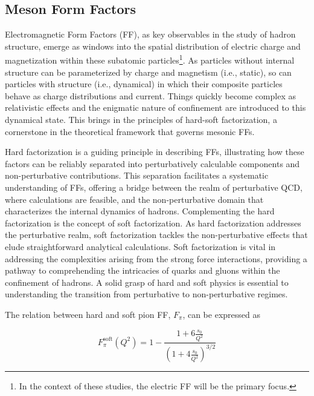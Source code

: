 \documentclass[
]{report}
\begin{document}
\label{Chapter-1-2}

\hypertarget{meson-form-factors}{%
\subsection{Meson Form Factors}\label{meson-form-factors}}

Electromagnetic Form Factors (FF), as key observables in the study of
hadron structure, emerge as windows into the spatial distribution of
electric charge and magnetization within these subatomic
particles\footnote{In the context of these studies, the electric FF will be the primary focus.}.
As particles without internal structure can be parameterized by charge
and magnetism (i.e., static), so can particles with structure (i.e.,
dynamical) in which their composite particles behave as charge
distributions and current. Things quickly become complex as relativistic
effects and the enigmatic nature of confinement are introduced to this
dynamical state. This brings in the principles of hard-soft
factorization, a cornerstone in the theoretical framework that governs
mesonic FFs.

Hard factorization is a guiding principle in describing FFs,
illustrating how these factors can be reliably separated into
perturbatively calculable components and non-perturbative contributions.
This separation facilitates a systematic understanding of FFs, offering
a bridge between the realm of perturbative QCD, where calculations are
feasible, and the non-perturbative domain that characterizes the
internal dynamics of hadrons. Complementing the hard factorization is
the concept of soft factorization. As hard factorization addresses the
perturbative realm, soft factorization tackles the non-perturbative
effects that elude straightforward analytical calculations. Soft
factorization is vital in addressing the complexities arising from the
strong force interactions, providing a pathway to comprehending the
intricacies of quarks and gluons within the confinement of hadrons. A
solid grasp of hard and soft physics is essential to understanding the
transition from perturbative to non-perturbative regimes.

The relation between hard and soft pion FF, \(F_{\pi}\), can be
expressed as

\begin{equation} 
    F_{\pi}^{\mathrm{soft}}(Q^2)=1-\frac{1+6\frac{s_0}{Q^2}}{(1+4\frac{s_0}{Q^2})^{3/2}}
  \label{eq:pi_ff_soft} 
\end{equation}
\end{document}
